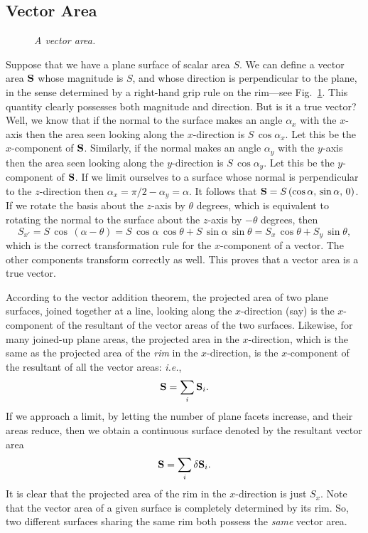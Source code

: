 \subsection{Vector Area}\label{sect22}
\begin{figure}
\epsfysize=2in
\centerline{}
\caption{\em A vector area.}\label{f4}
\end{figure}
Suppose that we have a plane surface of scalar area $S$. We can define a vector
area ${\bf S}$ whose magnitude is $S$, and whose direction is perpendicular to
the plane, in the sense determined  by a right-hand grip rule on the rim---see Fig.~\ref{f4}.
This quantity clearly possesses both magnitude and direction. But is it a true
vector? Well, we know that if the normal to the surface makes an angle $\alpha_x$ with
the $x$-axis then the area seen looking along the $x$-direction is $S\,\cos\alpha_x$.
Let this be the $x$-component of ${\bf S}$.
Similarly, if the normal makes an angle $\alpha_y$ with the $y$-axis then the
area seen looking along the $y$-direction is $S\,\cos\alpha_y$. 
Let this be the $y$-component of ${\bf S}$. If we limit ourselves to a surface whose
normal is perpendicular to the $z$-direction then $\alpha_x = \pi/2-\alpha_y=\alpha$.
It follows that ${\bf S} = S\,(\cos\alpha,\, \sin\alpha,\, 0)$. If we rotate the
basis about the
$z$-axis by $\theta$ degrees, which is equivalent to rotating the normal to
the surface about the $z$-axis by $-\theta$ degrees, then
\begin{equation}\label{e29}
S_{x'} = S\,\cos\,(\alpha-\theta) = S\,\cos\alpha\,\cos\theta + S\,\sin\alpha\,\sin\theta
= S_x\,\cos\theta + S_y\,\sin\theta,
\end{equation}
which is the correct transformation rule for the $x$-component of a vector. The
other components transform correctly as well. This  proves
that a vector area is a
true vector.

According to the vector addition theorem, the projected area of two plane surfaces,
joined together at a line, 
looking along the $x$-direction (say) is the $x$-component of the resultant of the vector areas of the two surfaces.
Likewise, for many joined-up plane areas, the projected area in the $x$-direction,
which is the same as the projected area of the {\em rim}\/ in the $x$-direction, is the
$x$-component  of the resultant of all the vector areas: {\em i.e.}, 
\begin{equation}
{\bf S} = \sum_i {\bf S}_i.
\end{equation}
If we approach a limit,
by letting the number of plane facets increase, and their areas reduce, then we
obtain a continuous surface denoted by the resultant vector area
\begin{equation}
 {\bf S} = \sum_i \delta  {\bf S}_i.
\end{equation}
It is
clear that the projected area of the rim in the $x$-direction is just $S_x$. 
Note that the vector area of a given surface is completely determined by its
rim. So, two different surfaces sharing the same rim both possess the {\em same}\/
vector area. 

